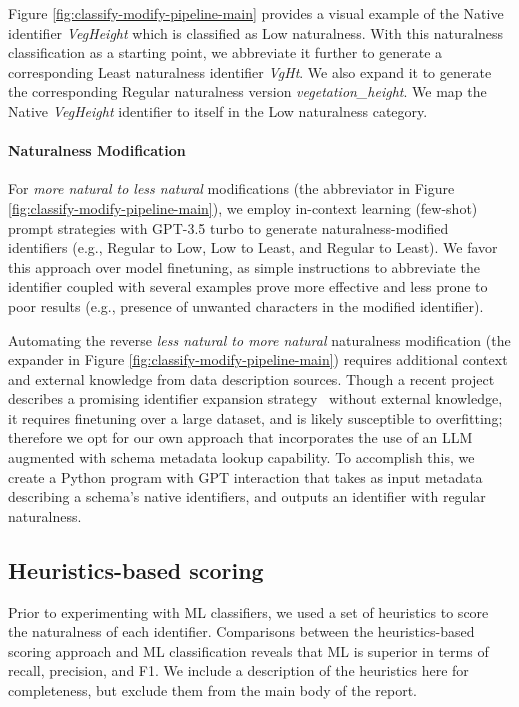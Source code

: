Figure \ref{fig:classify-modify-pipeline-main} provides a visual example of the Native identifier \emph{VegHeight} which is classified as Low naturalness.
With this naturalness classification as a starting point, we abbreviate it further to generate a corresponding Least naturalness identifier \emph{VgHt}.
We also expand it to generate the corresponding Regular naturalness version \emph{vegetation\_height}.
We map the Native \emph{VegHeight} identifier to itself in the Low naturalness category.

\paragraph{\textbf{Naturalness Modification}}
For \emph{more natural to less natural} modifications (the abbreviator in Figure \ref{fig:classify-modify-pipeline-main}), we employ in-context learning (few-shot) prompt strategies with GPT-3.5 turbo to generate naturalness-modified identifiers (e.g., Regular to Low, Low to Least, and Regular to Least).
We favor this approach over model finetuning, as simple instructions to abbreviate the identifier coupled with several examples prove more effective and less prone to poor results (e.g., presence of unwanted characters in the modified identifier).

Automating the reverse \emph{less natural to more natural} naturalness modification (the expander in Figure \ref{fig:classify-modify-pipeline-main}) requires additional context and external knowledge from data description sources.
Though a recent project describes a promising identifier expansion strategy~\cite{nameguess} without external knowledge, it requires finetuning over a large dataset, and is likely susceptible to overfitting; therefore we opt for our own approach that incorporates the use of an LLM augmented with schema metadata lookup capability.
To accomplish this, we create a Python program with GPT interaction that takes as input metadata describing a schema's native identifiers, and outputs an identifier with regular naturalness.

\subsection{Heuristics-based scoring} 

Prior to experimenting with ML classifiers, we used a set of heuristics to score the naturalness of each identifier. 
Comparisons between the heuristics-based scoring approach and ML classification reveals that ML is superior in terms of recall, precision, and F1.
We include a description of the heuristics here for completeness, but exclude them from the main body of the report.

